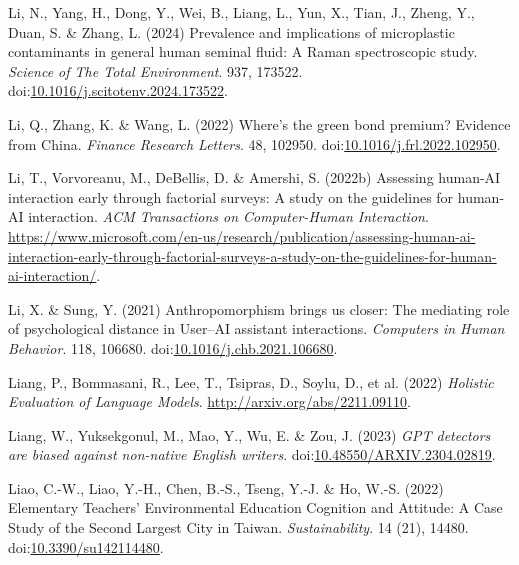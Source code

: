 \documentclass[
  letterpaper,
  DIV=11,
  numbers=noendperiod]{scrartcl}
\newlength{\cslhangindent}
\newenvironment{CSLReferences}[2] %
 {\begin{list}{}{%
  \setlength{\itemindent}{0pt}
  \setlength{\leftmargin}{0pt}
  \setlength{\parsep}{0pt}
  \ifodd #1
   \setlength{\leftmargin}{\cslhangindent}
   \setlength{\itemindent}{-1\cslhangindent}
  \fi
  \setlength{\itemsep}{#2\baselineskip}}}
 {\end{list}}
\begin{document}
\begin{CSLReferences}{0}{1}
Li, N., Yang, H., Dong, Y., Wei, B., Liang, L., Yun, X., Tian, J.,
Zheng, Y., Duan, S. \& Zhang, L. (2024) Prevalence and implications of
microplastic contaminants in general human seminal fluid: {A Raman}
spectroscopic study. \emph{Science of The Total Environment}. 937,
173522.
doi:\href{https://doi.org/10.1016/j.scitotenv.2024.173522}{10.1016/j.scitotenv.2024.173522}.

Li, Q., Zhang, K. \& Wang, L. (2022) Where's the green bond premium?
{Evidence} from {China}. \emph{Finance Research Letters}. 48, 102950.
doi:\href{https://doi.org/10.1016/j.frl.2022.102950}{10.1016/j.frl.2022.102950}.

Li, T., Vorvoreanu, M., DeBellis, D. \& Amershi, S. (2022b) Assessing
human-{AI} interaction early through factorial surveys: {A} study on the
guidelines for human-{AI} interaction. \emph{ACM Transactions on
Computer-Human Interaction}.
\url{https://www.microsoft.com/en-us/research/publication/assessing-human-ai-interaction-early-through-factorial-surveys-a-study-on-the-guidelines-for-human-ai-interaction/}.

Li, X. \& Sung, Y. (2021) Anthropomorphism brings us closer: {The}
mediating role of psychological distance in {User}--{AI} assistant
interactions. \emph{Computers in Human Behavior}. 118, 106680.
doi:\href{https://doi.org/10.1016/j.chb.2021.106680}{10.1016/j.chb.2021.106680}.

Liang, P., Bommasani, R., Lee, T., Tsipras, D., Soylu, D., et al. (2022)
\emph{Holistic {Evaluation} of {Language Models}}.
\url{http://arxiv.org/abs/2211.09110}.

Liang, W., Yuksekgonul, M., Mao, Y., Wu, E. \& Zou, J. (2023)
\emph{{GPT} detectors are biased against non-native {English} writers}.
doi:\href{https://doi.org/10.48550/ARXIV.2304.02819}{10.48550/ARXIV.2304.02819}.

Liao, C.-W., Liao, Y.-H., Chen, B.-S., Tseng, Y.-J. \& Ho, W.-S. (2022)
Elementary {Teachers}' {Environmental Education Cognition} and
{Attitude}: {A Case Study} of the {Second Largest City} in {Taiwan}.
\emph{Sustainability}. 14 (21), 14480.
doi:\href{https://doi.org/10.3390/su142114480}{10.3390/su142114480}.


\end{CSLReferences}
\end{document}
